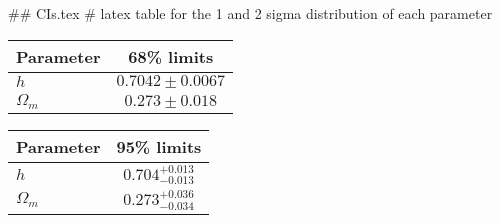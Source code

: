 ## CIs.tex
# latex table for the 1 and 2 sigma distribution of each parameter

\begin{tabular} { l  c}
 Parameter &  68\% limits\\
\hline
{\boldmath$h              $} & $0.7042\pm 0.0067          $\\
{\boldmath$\Omega_m       $} & $0.273\pm 0.018            $\\
\hline
\end{tabular}

\begin{tabular} { l  c}
 Parameter &  95\% limits\\
\hline
{\boldmath$h              $} & $0.704^{+0.013}_{-0.013}   $\\
{\boldmath$\Omega_m       $} & $0.273^{+0.036}_{-0.034}   $\\
\hline
\end{tabular}

